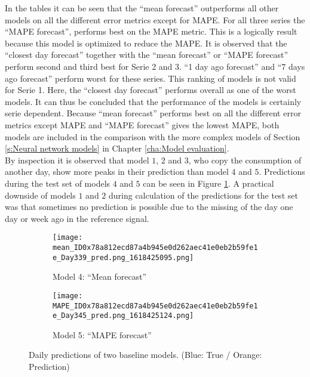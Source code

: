 In the tables it can be seen that the ``mean forecast'' outperforms all other models on all the different error metrics except for MAPE. For all three series the ``MAPE forecast'', performs best on the MAPE metric. This is a logically result because this model is optimized to reduce the MAPE. It is observed that the ``closest day forecast'' together with the ``mean forecast'' or ``MAPE forecast'' perform second and third best for Serie 2 and 3. ``1 day ago forecast'' and ``7 days ago forecast'' perform worst for these series. This ranking of models is not valid for Serie 1. Here, the ``closest day forecast'' performs overall as one of the worst models. It can thus be concluded that the performance of the models is certainly serie dependent. Because ``mean forecast'' performs best on all the different error metrics except MAPE and ``MAPE forecast'' gives the lowest MAPE, both models are included in the comparison with the more complex models of Section \ref{s:Neural network models} in Chapter \ref{cha:Model evaluation}.\\

By inspection it is observed that model $ 1 $, $ 2 $ and $ 3 $, who copy the consumption of another day, show more peaks in their prediction than model $ 4 $ and $ 5 $. Predictions during the test set of models $ 4 $ and $ 5 $ can be seen in Figure \ref{fig:baseline models 4 and 5}. A practical downside of models $ 1 $ and $ 2 $ during calculation of the predictions for the test set was that sometimes no prediction is possible due to the missing of the day one day or week ago in the reference signal.\\

\begin{figure}[ht]
	\begin{subfigure}{0.5\textwidth}
		\texttt{[image: mean\_ID0x78a812ecd87a4b945e0d262aec41e0eb2b59fe1e\_Day339\_pred.png\_1618425095.png]}
		\caption{Model 4: ``Mean forecast''}
	\end{subfigure}	
	\begin{subfigure}{0.5\textwidth}
		\texttt{[image: MAPE\_ID0x78a812ecd87a4b945e0d262aec41e0eb2b59fe1e\_Day345\_pred.png\_1618425124.png]}
		\caption{Model 5: ``MAPE forecast''}
	\end{subfigure}
	\caption{Daily predictions of two baseline models. (Blue: True / Orange: Prediction) }
	\label{fig:baseline models 4 and 5}
\end{figure}


